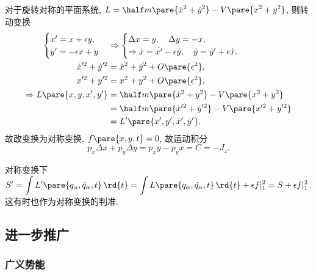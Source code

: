 \documentclass[../LectureNotes.tex]{subfiles}
\begin{document}
\begin{sample}
    \begin{ex}
        对于旋转对称的平面系统, $L = \displaystyle \half m\pare{\dot{x}^2 + \dot{y}^2} - V\pare{x^2+y^2}$, 则转动变换
        \begin{align*}
            \begin{cases}
                x' = x+\epsilon y,\\
                y' = -\epsilon x + y
            \end{cases} & \Rightarrow \begin{cases}
                \Delta x = y,\quad \Delta y = -x, \\
                \Rightarrow \dot{x} = \dot{x'} - \epsilon \dot{y},\quad \dot{y} = \dot{y}' + \epsilon \dot{x}.
            \end{cases}\\
            \dot{x}'^2 + \dot{y}'^2 &= \dot{x}^2 + \dot{y}^2 + O\pare{\epsilon^2},\\
            x'^2 + y'^2 &= x^2 + y^2 + O\pare{\epsilon^2}, \\
            \Rightarrow L\pare{x,y,x',y'} &= \half m\pare{\dot{x}^2 + \dot{y}^2} - V\pare{x^2 + y^2} \\
            &= \half m\pare{\dot{x}'^2 + \dot{y}'^2} - V\pare{x'^2 + y'^2} \\
            &= L'\pare{x', y', \dot{x}', \dot{y}'}.
        \end{align*}
        故改变换为对称变换, $f\pare{x,y,t} = 0$, 故运动积分
        \[ p_x \Delta x + p_y \Delta y = p_x y - p_y x = C = -J_z. \]
    \end{ex}
\end{sample}
对称变换下$\displaystyle S' = \int L'\pare{q_\alpha, \dot{q}_\alpha, t}\,\rd{t} = \int L\pare{q_\alpha, \dot{q}_\alpha, t}\,\rd{t} + \epsilon f\vert_1^2 = S + \epsilon f\vert_1^2$. 这有时也作为对称变换的判准.



\subsection{进一步推广} %
\label{sub:进一步推广}

\subsubsection{广义势能} %
\label{ssub:广义势能}
\end{document}
